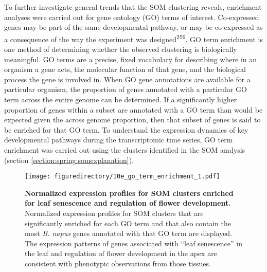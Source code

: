 \documentclass[12pt,]{book}
\begin{document}
To further investigate general trends that the SOM clustering reveals,
enrichment analyses were carried out for gene ontology (GO) terms of
interest. Co-expressed genes may be part of the same developmental
pathway, or may be co-expressed as a consequence of the way the
experiment was designed\textsuperscript{259}. GO term enrichment is one
method of determining whether the observed clustering is biologically
meaningful. GO terms are a precise, fixed vocabulary for describing
where in an organism a gene acts, the molecular function of that gene,
and the biological process the gene is involved in. When GO gene
annotations are available for a particular organism, the proportion of
genes annotated with a particular GO term across the entire genome can
be determined. If a significantly higher proportion of genes within a
subset are annotated with a GO term than would be expected given the
across genome proportion, then that subset of genes is said to be
enriched for that GO term. To understand the expression dynamics of key
developmental pathways during the transcriptomic time series, GO term
enrichment was carried out using the clusters identified in the SOM
analysis (section \ref{section:spring:somexplanation}).

\begin{figure}[htbp]
\centering
\texttt{[image: figuredirectory/10e\_go\_term\_enrichment\_1.pdf]}
\caption{\textbf{Normalized expression profiles for SOM clusters
enriched for leaf senescence and regulation of flower development.}
Normalized expression profiles for SOM clusters that are significantly
enriched for each GO term and that also contain the most \emph{B. napus}
genes annotated with that GO term are displayed. The expression patterns
of genes associated with ``leaf senescence'' in the leaf and regulation
of flower development in the apex are consistent with phenotypic
observations from those tissues.}\label{figure:219:go1som}
\end{figure}
\end{document}
